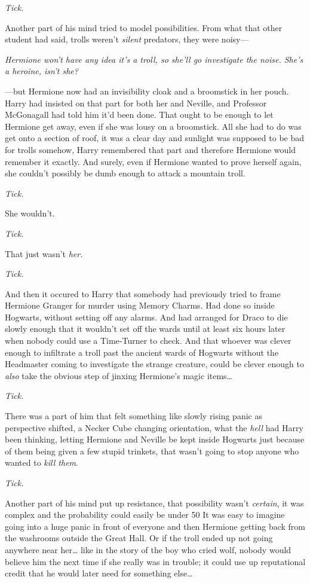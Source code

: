 \emph{Tick.}

Another part of his mind tried to model possibilities. From what that other 
student had said, trolls weren't \emph{silent} predators, they were noisy---

\emph{Hermione won't have any idea it's a troll, so she'll go investigate the 
noise. She's a heroine, isn't she?}

---but Hermione now had an invisibility cloak and a broomstick in her pouch. 
Harry had insisted on that part for both her and Neville, and Professor 
McGonagall had told him it'd been done. That ought to be enough to let Hermione 
get away, even if she was lousy on a broomstick. All she had to do was get onto 
a section of roof, it was a clear day and sunlight was supposed to be bad for 
trolls somehow, Harry remembered that part and therefore Hermione would 
remember it exactly. And surely, even if Hermione wanted to prove herself 
again, she couldn't possibly be dumb enough to attack a mountain troll.

\emph{Tick.}

She wouldn't.

\emph{Tick.}

That just wasn't \emph{her.}

\emph{Tick.}

And then it occured to Harry that somebody had previously tried to frame 
Hermione Granger for murder using Memory Charms. Had done so inside Hogwarts, 
without setting off any alarms. And had arranged for Draco to die slowly enough 
that it wouldn't set off the wards until at least six hours later when nobody 
could use a Time-Turner to check. And that whoever was clever enough to 
infiltrate a troll past the ancient wards of Hogwarts without the Headmaster 
coming to investigate the strange creature, could be clever enough to 
\emph{also} take the obvious step of jinxing Hermione's magic items{\ldots}

\emph{Tick.}

There was a part of him that felt something like slowly rising panic as 
perspective shifted, a Necker Cube changing orientation, what the \emph{hell} 
had Harry been thinking, letting Hermione and Neville be kept inside Hogwarts 
just because of them being given a few stupid trinkets, that wasn't going to 
stop anyone who wanted to \emph{kill them}.

\emph{Tick.}

Another part of his mind put up resistance, that possibility wasn't 
\emph{certain}, it was complex and the probability could easily be under 50%
It was easy to imagine going into a huge panic in front of everyone and then 
Hermione getting back from the washrooms outside the Great Hall. Or if the 
troll ended up not going anywhere near her{\ldots} like in the story of the boy 
who cried wolf, nobody would believe him the next time if she really was in 
trouble; it could use up reputational credit that he would later need for 
something else{\ldots}

